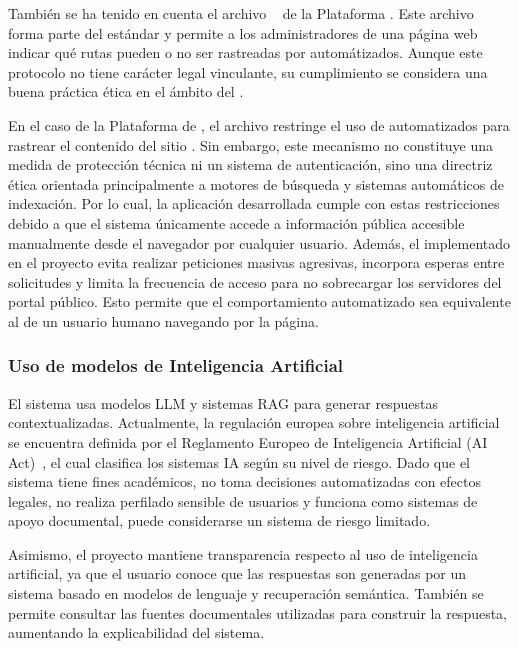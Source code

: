 También se ha tenido en cuenta el archivo ~\cite{legal:robots} de la Plataforma \contsec{}. Este archivo forma parte del estándar  y permite a los administradores de una página web indicar qué rutas pueden o no ser rastreadas por  automátizados. Aunque este protocolo no tiene carácter legal vinculante, su cumplimiento se considera una buena práctica ética en el ámbito del .

En el caso de la Plataforma de \contsec{}, el archivo  restringe el uso de  automatizados para rastrear el contenido del sitio . Sin embargo, este mecanismo no constituye una medida de protección técnica ni un sistema de autenticación, sino una directriz ética orientada principalmente a motores de búsqueda y sistemas automáticos de indexación. Por lo cual, la aplicación desarrollada cumple con estas restricciones debido a que el sistema únicamente accede a información pública accesible manualmente desde el navegador por cualquier usuario. Además, el  implementado en el proyecto evita realizar peticiones masivas agresivas, incorpora esperas entre solicitudes y limita la frecuencia de acceso para no sobrecargar los servidores del portal público. Esto permite que el comportamiento automatizado sea equivalente al de un usuario humano navegando por la página.

\subsubsection{Uso de modelos de Inteligencia Artificial}\label{subsec:IA}

El sistema usa modelos LLM y sistemas RAG para generar respuestas contextualizadas. Actualmente, la regulación europea sobre inteligencia artificial se encuentra definida por el Reglamento Europeo de Inteligencia Artificial (AI Act)~\cite{legal:IA}, el cual clasifica los sistemas IA según su nivel de riesgo. Dado que el sistema tiene fines académicos, no toma decisiones automatizadas con efectos legales, no realiza perfilado sensible de usuarios y funciona como sistemas de apoyo documental, puede considerarse un sistema de riesgo limitado. 

Asimismo, el proyecto mantiene transparencia respecto al uso de inteligencia artificial, ya que el usuario conoce que las respuestas son generadas por un sistema basado en modelos de lenguaje y recuperación semántica. También se permite consultar las fuentes documentales utilizadas para construir la respuesta, aumentando la explicabilidad del sistema.


